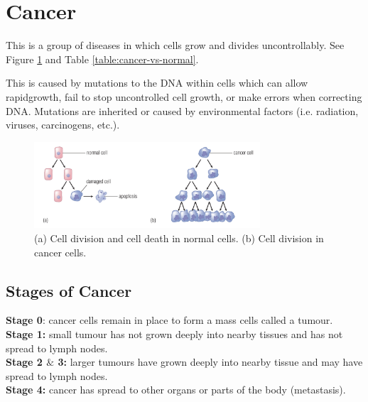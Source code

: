 \documentclass[12pt]{report}
\begin{document}
\section{Cancer}
\begin{definition}[Cancer]
    This is a group of diseases in which cells grow and divides uncontrollably. See Figure \ref{fig:cancer} and Table \ref{table:cancer-vs-normal}.
\end{definition}

This is caused by mutations to the DNA within cells which can allow rapidgrowth, fail to stop uncontrolled cell growth, or make errors when correcting DNA. Mutations are inherited or caused by environmental factors (i.e. radiation, viruses, carcinogens, etc.).

\begin{figure}[H]
\centering
    \includegraphics[width=0.75\textwidth]{../figures/cancer.png}
    \caption{(a) Cell division and cell death in normal cells. (b) Cell division in cancer cells.}
    \label{fig:cancer}
\end{figure}

\subsection{Stages of Cancer}
\textbf{Stage 0}: cancer cells remain in place to form a mass cells called a tumour.\\ 
\textbf{Stage 1:} small tumour has not grown deeply into nearby tissues and has not spread to lymph nodes.\\ 
\textbf{Stage 2 $\&$ 3:} larger tumours have grown deeply into nearby tissue and may have spread to lymph nodes.\\
\textbf{Stage 4:} cancer has spread to other organs or parts of the body (metastasis).
\end{document}
